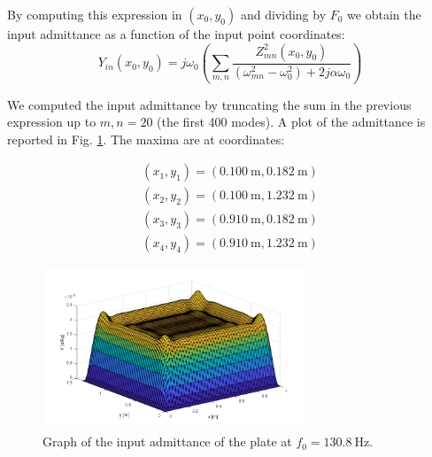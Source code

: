 \documentclass[a4paper]{article}
\begin{document}
By computing this expression in $(x_0, y_0)$ and dividing by $F_0$ we obtain the input admittance as a function of the input point coordinates:
$$ Y_{in}(x_0, y_0) =  j\omega_0 \left( \sum_{m,n} \frac{Z_{mn}^2(x_0, y_0)}{(\omega_{mn}^2 - \omega_0^2) + 2j\alpha \omega_0} \right)$$

We computed the input admittance by truncating the sum in the previous expression up to $m, n = 20$ (the first 400 modes). A plot of the admittance is reported in Fig. \ref{fig:adm}. The maxima are at coordinates:

\begin{align*}
	(x_1, y_1) = (\SI{0.100}{\metre}, \SI{0.182}{\meter}) \\
	(x_2, y_2) = (\SI{0.100}{\metre}, \SI{1.232}{\meter}) \\
	(x_3, y_3) = (\SI{0.910}{\metre}, \SI{0.182}{\meter}) \\
	(x_4, y_4) = (\SI{0.910}{\metre}, \SI{1.232}{\meter})
\end{align*}

\begin{figure}[h]
	\centering
	\includegraphics[width=0.7\textwidth]{admittance.png}
	\caption{Graph of the input admittance of the plate at $f_0 = \SI{130.8}{\hertz}$.}
	\label{fig:adm}
\end{figure}


\printbibliography
\end{document}
